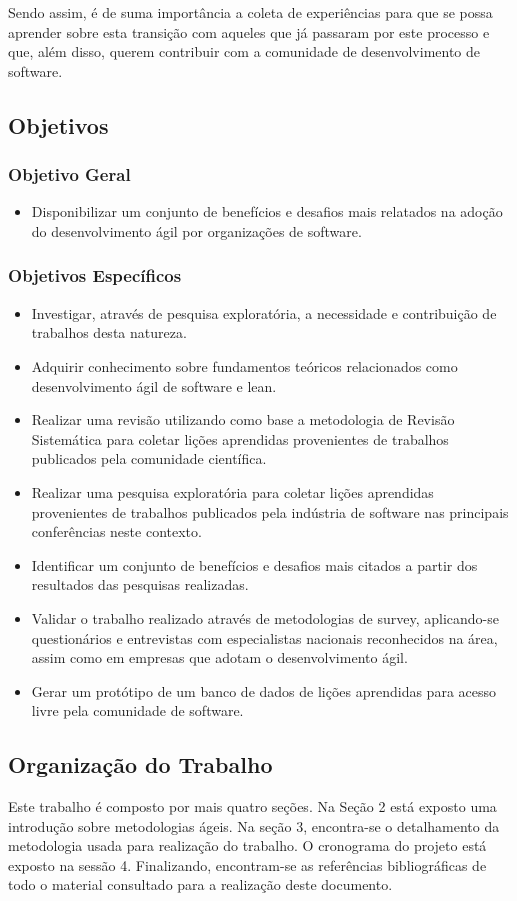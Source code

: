 \documentclass[a4paper,11pt]{article}
\begin{document}
Sendo assim, é de suma importância a coleta de experiências para que se possa aprender sobre esta transição com aqueles que já passaram por este processo e que, além disso, querem contribuir com a comunidade de desenvolvimento de software.
\subsection{Objetivos}
\subsubsection{Objetivo Geral}
\begin{itemize}
	\item Disponibilizar um conjunto de benefícios e desafios mais relatados na adoção do desenvolvimento ágil por organizações de software.
\end{itemize}
\subsubsection{Objetivos Específicos}
\begin{itemize}
	\item Investigar, através de pesquisa exploratória, a necessidade e contribuição de trabalhos desta natureza.
	\item Adquirir conhecimento sobre fundamentos teóricos relacionados como desenvolvimento ágil de software e lean.
	\item Realizar uma revisão utilizando como base a metodologia de Revisão Sistemática \cite{Barbara2004} para coletar lições aprendidas provenientes de trabalhos publicados pela comunidade científica.
	\item Realizar uma pesquisa exploratória para coletar lições aprendidas provenientes de trabalhos publicados pela indústria de software nas principais conferências neste contexto.
	\item Identificar um conjunto de benefícios e desafios mais citados a partir dos resultados das pesquisas realizadas.
	\item Validar o trabalho realizado através de metodologias de survey, aplicando-se questionários e entrevistas com especialistas nacionais reconhecidos na área, assim como em empresas que adotam o desenvolvimento ágil.
	\item Gerar um protótipo de um banco de dados de lições aprendidas para acesso livre pela comunidade de software.
\end{itemize}
\subsection{Organização do Trabalho}
Este trabalho é composto por mais quatro seções. Na Seção 2 está exposto uma introdução sobre metodologias ágeis. Na seção 3,  encontra-se o detalhamento da metodologia usada para realização do trabalho. O cronograma do projeto está exposto na sessão 4. Finalizando, encontram-se as referências bibliográficas de todo o material consultado para a realização deste documento.
\end{document}
